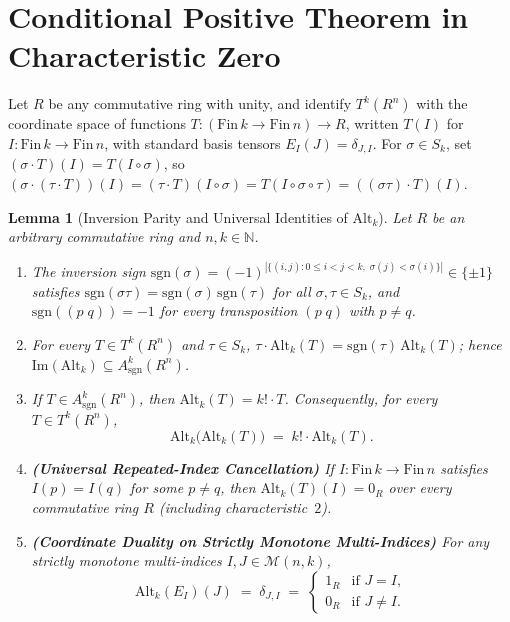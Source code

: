 \documentclass[11pt,a4paper]{article}
\newtheorem{lemma}[theorem]{Lemma}
\theoremstyle{definition}
\theoremstyle{remark}
\newcommand{\Alt}{\mathrm{Alt}}
\newcommand{\sgn}{\mathrm{sgn}}
\newcommand{\im}{\mathrm{Im}}
\newcommand{\N}{\mathbb{N}}
\begin{document}
\section{Conditional Positive Theorem in Characteristic Zero}

Let $R$ be any commutative ring with unity, and identify $T^k(R^n)$ with the coordinate space of functions $T : (\mathrm{Fin}\,k \to \mathrm{Fin}\,n) \to R$, written $T(I)$ for $I : \mathrm{Fin}\,k \to \mathrm{Fin}\,n$, with standard basis tensors $E_I(J) = \delta_{J,I}$. For $\sigma \in S_k$, set $(\sigma \cdot T)(I) = T(I \circ \sigma)$, so $(\sigma \cdot (\tau \cdot T))(I) = (\tau \cdot T)(I \circ \sigma) = T(I \circ \sigma \circ \tau) = ((\sigma\tau) \cdot T)(I)$.

\begin{lemma}[Inversion Parity and Universal Identities of $\Alt_k$]\label{lem:alt-identities}
Let $R$ be an arbitrary commutative ring and $n, k \in \N$.
\begin{enumerate}
\item[(a)] The inversion sign $\sgn(\sigma) = (-1)^{|\{(i,j) : 0 \le i < j < k,\; \sigma(j) < \sigma(i)\}|} \in \{\pm 1\}$ satisfies $\sgn(\sigma\tau) = \sgn(\sigma)\,\sgn(\tau)$ for all $\sigma, \tau \in S_k$, and $\sgn((p\;q)) = -1$ for every transposition $(p\;q)$ with $p \neq q$.
\item[(b)] For every $T \in T^k(R^n)$ and $\tau \in S_k$, $\tau \cdot \Alt_k(T) = \sgn(\tau)\,\Alt_k(T)$; hence $\im(\Alt_k) \subseteq A^k_{\sgn}(R^n)$.
\item[(c)] If $T \in A^k_{\sgn}(R^n)$, then $\Alt_k(T) = k! \cdot T$. Consequently, for \emph{every} $T \in T^k(R^n)$,
\begin{equation}\label{eq:alt-scaling}
  \Alt_k\bigl(\Alt_k(T)\bigr) \;=\; k! \cdot \Alt_k(T).
\end{equation}
\item[(d)] \textbf{(Universal Repeated-Index Cancellation)} If $I : \mathrm{Fin}\,k \to \mathrm{Fin}\,n$ satisfies $I(p) = I(q)$ for some $p \neq q$, then $\Alt_k(T)(I) = 0_R$ over \emph{every} commutative ring $R$ (including characteristic~$2$).
\item[(e)] \textbf{(Coordinate Duality on Strictly Monotone Multi-Indices)} For any strictly monotone multi-indices $I, J \in \mathcal{M}(n, k)$,
\begin{equation}\label{eq:duality}
  \Alt_k(E_I)(J) \;=\; \delta_{J, I} \;=\;
  \begin{cases}
    1_R & \text{if } J = I,\\
    0_R & \text{if } J \neq I.
  \end{cases}
\end{equation}
\end{enumerate}
\end{lemma}
\end{document}
